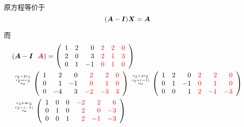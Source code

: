 \begin{jie}
原方程等价于
$$
(\boldsymbol{A}-\boldsymbol{I})\boldsymbol{X}=\boldsymbol{A}
$$

而
$$
\begin{aligned}
&  (\boldsymbol{A}-\boldsymbol{I} ~~\textcolor{red}{\boldsymbol{A}}) =\left(
                       \begin{array}{rrrrrr}
                         1&2& 0&\textcolor{red}{2}&\textcolor{red}{2}&\textcolor{red}{0}\\
                         2&0& 3&\textcolor{red}{2}&\textcolor{red}{1}&\textcolor{red}{3}\\
                         0&1&-1&\textcolor{red}{0}&\textcolor{red}{1}&\textcolor{red}{0}
                       \end{array}
                                                 \right)\\
                                                 &\overset{r_2-2r_1\atop r_2\leftrightarrow r_3}{\sim}
                                                 \left(
                                                 \begin{array}{rrrrrr}
                                                   1& 2& 0&\textcolor{red}{ 2}&\textcolor{red}{ 2}&\textcolor{red}{0}\\
                                                   0& 1&-1&\textcolor{red}{ 0}&\textcolor{red}{ 1}&\textcolor{red}{0}\\
                                                   0&-4& 3&\textcolor{red}{-2}&\textcolor{red}{-3}&\textcolor{red}{3}
                                                 \end{array}
                                                                              \right)     
                       \overset{r_3+4r_2\atop r_3\div(-1)}{\sim}
                       \left(
                       \begin{array}{rrrrrr}
                         1&2& 0&\textcolor{red}{2}&\textcolor{red}{ 2}&\textcolor{red}{ 0}\\
                         0&1&-1&\textcolor{red}{0}&\textcolor{red}{ 1}&\textcolor{red}{ 0}\\
                         0&0& 1&\textcolor{red}{2}&\textcolor{red}{-1}&\textcolor{red}{-3}
                       \end{array}
                                                  \right) \\ 
                     &  
                       \overset{r_3+4r_2\atop r_3\div(-1)}{\sim}
                       \left(
                       \begin{array}{rrrrrr}
                         1&0&0&\textcolor{red}{-2}&\textcolor{red}{2}&\textcolor{red}{6}\\
                         0&1&0&\textcolor{red}{2}&\textcolor{red}{0}&\textcolor{red}{-3}\\
                         0&0&1&\textcolor{red}{2}&\textcolor{red}{-1}&\textcolor{red}{-3}
                       \end{array}
                                                 \right)
\end{aligned}
$$
\end{jie}




